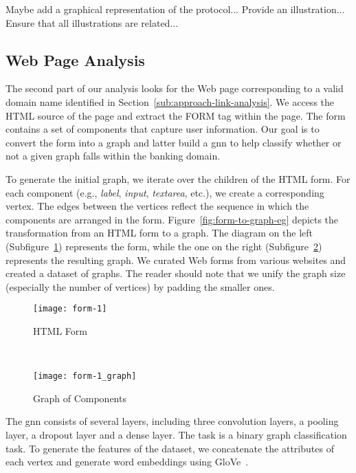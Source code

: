 Maybe add a graphical representation of the protocol...
Provide an illustration... Ensure that all illustrations are related...


\subsection{Web Page Analysis} %
\label{sub:approach-web-page-analysis}

The second part of our analysis looks for the Web page corresponding to a valid domain name identified in Section~\ref{sub:approach-link-analysis}. We access the HTML source of the page and extract the FORM tag within the page. The form contains a set of components that capture user information. Our goal is to convert the form into a graph and latter build a \gls{gnn} to help classify whether or not a given graph falls within the banking domain. 

To generate the initial graph, we iterate over the children of the HTML form. For each component (e.g., \emph{label}, \emph{input}, \emph{textarea}, etc.), we create a corresponding vertex. The edges between the vertices reflect the sequence in which the components are arranged in the form.  Figure~\ref{fig:form-to-graph-eg} depicts the transformation from an HTML form to a graph. The diagram on the left (Subfigure~\ref{fig:init-form}) represents the form, while the one on the right (Subfigure~\ref{fig:final-form}) represents the resulting graph. We curated Web forms from various websites and created a dataset of graphs. The reader should note that we unify the graph size (especially the number of vertices) by padding the smaller ones.

\begin{figure*}[th!]
    \centering
    \begin{subfigure}[t]{0.5\textwidth}
        \centering
        \texttt{[image: form-1]}
        \caption{HTML Form}
        \label{fig:init-form}
    \end{subfigure}%
    ~ 
    \begin{subfigure}[t]{0.5\textwidth}
        \centering
        \texttt{[image: form-1\_graph]}
        \caption{Graph of Components}
        \label{fig:final-form}
    \end{subfigure}
    \caption{From Form to Graph}
    \label{fig:form-to-graph-eg}
\end{figure*}

The \gls{gnn} consists of several layers, including three convolution layers, a pooling layer, a dropout layer and a dense layer. The task is a binary graph classification task. To generate the features of the dataset, we concatenate the attributes of each vertex and generate word embeddings using GloVe~\cite{pennington-socher-manning:2014}.  


